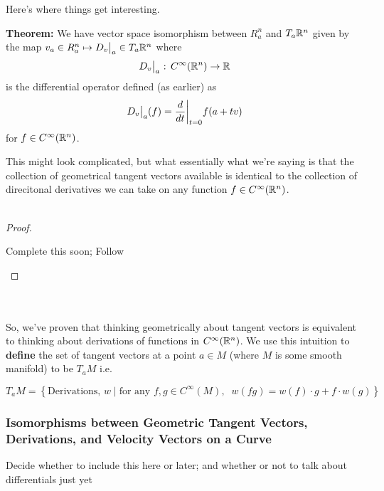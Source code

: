 \documentclass[11pt]{article}
\begin{document}
Here's where things get interesting.
\begin{bluebox}
  \textbf{Theorem:} We have vector space isomorphism between $R^{n}_{a}$ and $T_a \mathbb{R}^n$ given by the map $v_a \in R^n_{a} \mapsto \restr{D_{v}}{a} \in T_{a} \R^n$ where 
  \[ \restr{D_{v}}{a} \text{ : } C^{\infty}(\R^n) \rightarrow \R  \]
  is the differential operator defined (as earlier) as 
  \[ \restr{D_{v}}{a} (f) = \restr{\frac{d}{dt}}{t = 0} f(a + tv) \]
  for $f \in C^{\infty}(\mathbb{R}^n)$.
\end{bluebox}
This might look complicated, but what essentially what we're saying is that the collection of geometrical tangent vectors available is identical to the collection of direcitonal derivatives we can take on any function $f \in C^{\infty}(\mathbb{R}^n)$.
\\
\\
\begin{proof}
  \begin{note}
    {Complete this soon; Follow \cite[proposition 3.2]{LeeSM}}
  \end{note}
\end{proof}
\\
\\
So, we've proven that thinking geometrically about tangent vectors is equivalent to thinking about derivations of functions in $C^{\infty}(\mathbb{R}^n)$. We use this intuition to \textbf{define} the set of tangent vectors at a point $a \in M$ (where $M$ is some smooth manifold) to be $T_a M$ i.e. 
\begin{redbox}
  \[ T_a M = \left\{ \text{Derivations, } w \;\vert\; \text{for any } f,g \in C^{\infty}(M), \;\; w(fg) = w(f) \cdot g + f \cdot w(g) \right\}  \]
\end{redbox}
\vskip 0.5cm
\subsubsection{Isomorphisms between Geometric Tangent Vectors, Derivations, and Velocity Vectors on a Curve}
\begin{note}
  {Decide whether to include this here or later; and whether or not to talk about differentials just yet}
\end{note}
\end{document}
